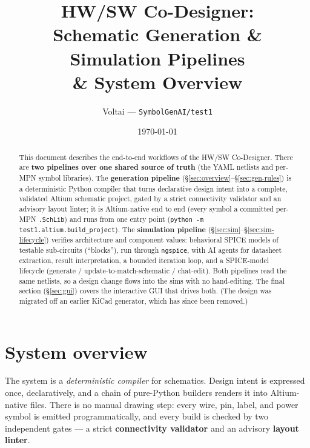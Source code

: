 \documentclass[11pt]{article}
\title{\textbf{HW/SW Co-Designer:\\ Schematic Generation \& Simulation Pipelines\\ \& System Overview}}
\author{Voltai --- \texttt{SymbolGenAI/test1}}
\date{\today}
\newcommand{\file}[1]{\texttt{#1}}
\begin{document}
\maketitle

\begin{abstract}
This document describes the end-to-end workflows of the HW/SW Co-Designer. There
are \textbf{two pipelines over one shared source of truth} (the YAML netlists and
per-MPN symbol libraries). The \textbf{generation pipeline}
(\S\ref{sec:overview}--\S\ref{sec:gen-rules}) is a deterministic Python compiler
that turns declarative design intent into a complete, validated Altium schematic
project, gated by a strict connectivity validator and an advisory layout linter;
it is Altium-native end to end (every symbol a committed per-MPN \file{.SchLib})
and runs from one entry point (\texttt{python -m test1.altium.build\_project}).
The \textbf{simulation pipeline} (\S\ref{sec:sim}--\S\ref{sec:sim-lifecycle})
verifies architecture and component values: behavioral SPICE models of testable
sub-circuits (``blocks''), run through \texttt{ngspice}, with AI agents for
datasheet extraction, result interpretation, a bounded iteration loop, and a
SPICE-model lifecycle (generate / update-to-match-schematic / chat-edit). Both
pipelines read the same netlists, so a design change flows into the sims with no
hand-editing. The final section
(\S\ref{sec:gui}) covers the interactive GUI that drives both. (The design was
migrated off an earlier KiCad generator, which has since been removed.)
\end{abstract}

\tableofcontents
\bigskip

\section{System overview}\label{sec:overview}

The system is a \emph{deterministic compiler} for schematics. Design intent is
expressed once, declaratively, and a chain of pure-Python builders renders it
into Altium-native files. There is no manual drawing step: every wire, pin,
label, and power symbol is emitted programmatically, and every build is checked
by two independent gates --- a strict \textbf{connectivity validator} and an
advisory \textbf{layout linter}.
\end{document}
